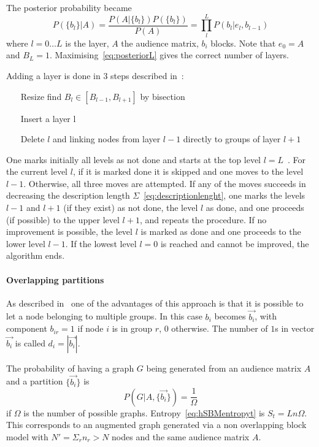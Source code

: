 The posterior probability became
\begin{equation}\label{eq:posteriorL}
  P(\{b_l\}|A)=\frac{P(A|\{b_l\})P(\{b_l\})}{P(A)}=\prod_l^L P(b_l|e_l,b_{l-1})
\end{equation}
where $l=0\dots L$ is the layer, $A$ the audience matrix, $b_i$ blocks. Note that $e_0=A$ and $B_L=1$.
Maximising~\ref{eq:posteriorL} gives the correct number of layers.

Adding a layer is done in 3 steps described in~\cite{peixoto2014hierarchic}:
\begin{itemize}
  \item[Resize] find $B_l\in[B_{l-1},B_{l+1}]$ by bisection
  \item[Insert] a layer l
  \item[Delete] $l$ and linking nodes from layer $l-1$ directly to groups of layer
  $l+1$
\end{itemize}
One marks initially all levels as not done and starts at the top level $l = L$~\cite{peixoto2014hierarchic}.
For the current level $l$, if it is marked done it is skipped and one moves to the level $l-1$.
Otherwise, all three moves are attempted. If any of the moves succeeds in decreasing the description length $\Sigma$~\ref{eq:descriptionlenght},
one marks the levels $l-1$ and $l+1$ (if they exist) as not done, the level $l$ as done, and one proceeds (if possible)
to the upper level $l+1$, and repeats the procedure.
If no improvement is possible, the level $l$ is marked as done and one proceeds to the lower level $l-1$.
If the lowest level $l=0$ is reached and cannot be improved, the algorithm ends.


\paragraph{Overlapping partitions}
As described in~\cite{peixoto2015model} one of the advantages of this approach
is that it is possible to let a node belonging to multiple groups.
In this case $b_i$ becomes $\vec{b_i}$, with component $b_{ir}=1$ if node $i$ is in
group $r$, $0$ otherwise. The number of $1$s in vector $\vec{b_i}$ is called
$d_i=|\vec{b_i}|$.

The probability of having a graph $G$ being generated from an audience matrix
$A$ and a partition $\{\vec{b_i}\}$ is \[P(G|A,\{\vec{b_i}\})=\frac{1}{\Omega}\]
if $\Omega$ is the number of possible graphs. Entropy~\ref{eq:hSBMentropyt} is
$S_t=Ln\Omega$. This corresponds to an augmented graph generated via a
non overlapping block model with $N'=\Sigma_r n_r>N$ nodes and the same
audience matrix $A$.

